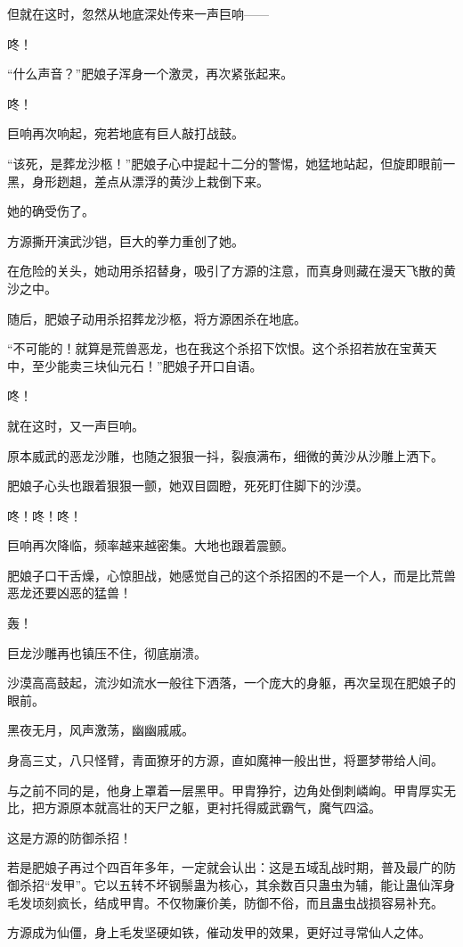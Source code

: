 \begin{this_body}
但就在这时，忽然从地底深处传来一声巨响——

咚！

“什么声音？”肥娘子浑身一个激灵，再次紧张起来。

咚！

巨响再次响起，宛若地底有巨人敲打战鼓。

“该死，是葬龙沙柩！”肥娘子心中提起十二分的警惕，她猛地站起，但旋即眼前一黑，身形趔趄，差点从漂浮的黄沙上栽倒下来。

她的确受伤了。

方源撕开演武沙铠，巨大的拳力重创了她。

在危险的关头，她动用杀招替身，吸引了方源的注意，而真身则藏在漫天飞散的黄沙之中。

随后，肥娘子动用杀招葬龙沙柩，将方源困杀在地底。

“不可能的！就算是荒兽恶龙，也在我这个杀招下饮恨。这个杀招若放在宝黄天中，至少能卖三块仙元石！”肥娘子开口自语。

咚！

就在这时，又一声巨响。

原本威武的恶龙沙雕，也随之狠狠一抖，裂痕满布，细微的黄沙从沙雕上洒下。

肥娘子心头也跟着狠狠一颤，她双目圆瞪，死死盯住脚下的沙漠。

咚！咚！咚！

巨响再次降临，频率越来越密集。大地也跟着震颤。

肥娘子口干舌燥，心惊胆战，她感觉自己的这个杀招困的不是一个人，而是比荒兽恶龙还要凶恶的猛兽！

轰！

巨龙沙雕再也镇压不住，彻底崩溃。

沙漠高高鼓起，流沙如流水一般往下洒落，一个庞大的身躯，再次呈现在肥娘子的眼前。

黑夜无月，风声激荡，幽幽戚戚。

身高三丈，八只怪臂，青面獠牙的方源，直如魔神一般出世，将噩梦带给人间。

与之前不同的是，他身上罩着一层黑甲。甲胄狰狞，边角处倒刺嶙峋。甲胄厚实无比，把方源原本就高壮的天尸之躯，更衬托得威武霸气，魔气四溢。

这是方源的防御杀招！

若是肥娘子再过个四百年多年，一定就会认出：这是五域乱战时期，普及最广的防御杀招“发甲”。它以五转不坏钢鬃蛊为核心，其余数百只蛊虫为辅，能让蛊仙浑身毛发顷刻疯长，结成甲胄。不仅物廉价美，防御不俗，而且蛊虫战损容易补充。

方源成为仙僵，身上毛发坚硬如铁，催动发甲的效果，更好过寻常仙人之体。


\end{this_body}
